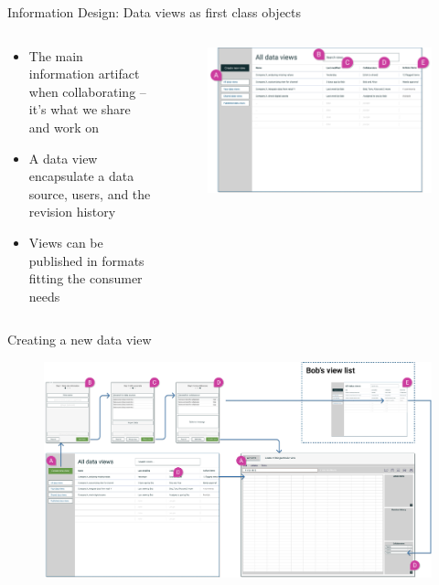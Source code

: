 \documentclass[aspectratio=169]{beamer}
\begin{document}
\begin{frame}{Information Design: Data views as first class objects}
    \begin{columns}
        \begin{column}{0.4\textwidth}
            \begin{itemize}
                \footnotesize
                \item The main information artifact when collaborating -- it's what we share and work on
                \item A data view encapsulate a data source, users, and the revision history
                \item Views can be published in formats fitting the consumer needs
            \end{itemize}
        \end{column}
        \begin{column}{0.6\textwidth}
            \begin{figure}[h]
                \centering
                \includegraphics[width=1.1\textwidth]{images/all-views-with-marks.png}
            \end{figure}
        \end{column}
    \end{columns}
\end{frame}

\begin{frame}{Creating a new data view}
    \begin{figure}[h]
        \centering
        \includegraphics[width=1\textwidth]{images/create-new-view-flow.png}
    \end{figure}
\end{frame}
\end{document}
